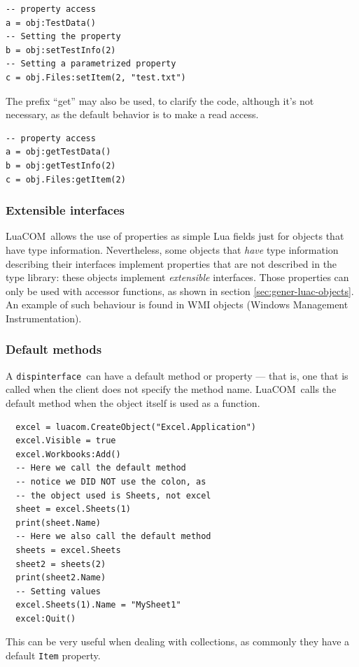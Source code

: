 \documentclass[11pt,a4paper,english]{report}
\newcommand{\ident}[1]{\mbox{\texttt{#1}}}
\newcommand{\techname}[1]{\mbox{#1}}
\newcommand{\luacom}{\techname{LuaCOM}}
\newcommand{\dispinterface}{\ident{dispinterface}}
\begin{document}
\begin{verbatim}
-- property access
a = obj:TestData()
-- Setting the property
b = obj:setTestInfo(2)
-- Setting a parametrized property
c = obj.Files:setItem(2, "test.txt")
\end{verbatim}

The prefix ``get'' may also be used, to clarify the code, although
it's not necessary, as the default behavior is to make a read access.

\begin{verbatim}
-- property access
a = obj:getTestData()
b = obj:getTestInfo(2)
c = obj.Files:getItem(2)
\end{verbatim}

\subsubsection{Extensible interfaces}
\label{sec:extens-interf}
\luacom\ allows the use of properties as simple Lua fields just for
objects that have type information. Nevertheless, some objects that
\emph{have} type information describing their interfaces implement
properties that are not described in the type library: these objects
implement \emph{extensible} interfaces. Those properties can only be
used with accessor functions, as shown in section
\ref{sec:gener-luac-objects}. An example of such behaviour is found in
WMI objects (Windows Management Instrumentation).

\subsubsection{Default methods}
\label{sec:default-methods}
A \dispinterface\ can have a default method or property --- that is, one
that is called when the client does not specify the method
name. \luacom\ calls the default method when the object itself is used
as a function.

\begin{verbatim}
  excel = luacom.CreateObject("Excel.Application")
  excel.Visible = true
  excel.Workbooks:Add()
  -- Here we call the default method
  -- notice we DID NOT use the colon, as
  -- the object used is Sheets, not excel
  sheet = excel.Sheets(1)
  print(sheet.Name)
  -- Here we also call the default method
  sheets = excel.Sheets
  sheet2 = sheets(2)
  print(sheet2.Name)
  -- Setting values
  excel.Sheets(1).Name = "MySheet1"
  excel:Quit()
\end{verbatim}

This can be very useful when dealing with collections, as commonly
they have a default \ident{Item} property.
\end{document}
